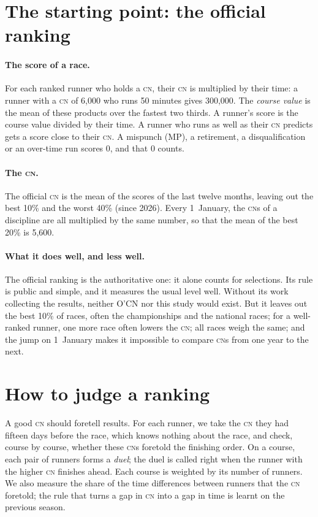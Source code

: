 \documentclass[11pt,a4paper]{article}
\newcommand{\CN}{\textsc{cn}}
\begin{document}
\section{The starting point: the official ranking}

\paragraph{The score of a race.} For each ranked runner who holds a \CN, their \CN{} is multiplied by their time: a runner with a \CN{} of 6,000 who runs 50 minutes gives 300,000. The \emph{course value} is the mean of these products over the fastest two thirds. A runner's score is the course value divided by their time. A runner who runs as well as their \CN{} predicts gets a score close to their \CN. A mispunch (MP), a retirement, a disqualification or an over-time run scores 0, and that 0 counts.

\paragraph{The \CN.} The official \CN{} is the mean of the scores of the last twelve months, leaving out the best 10\% and the worst 40\% (since 2026). Every 1~January, the \CN s of a discipline are all multiplied by the same number, so that the mean of the best 20\% is 5,600.

\paragraph{What it does well, and less well.} The official ranking is the authoritative one: it alone counts for selections. Its rule is public and simple, and it measures the usual level well. Without its work collecting the results, neither O'CN nor this study would exist. But it leaves out the best 10\% of races, often the championships and the national races; for a well-ranked runner, one more race often lowers the \CN; all races weigh the same; and the jump on 1~January makes it impossible to compare \CN s from one year to the next.

\section{How to judge a ranking}

A good \CN{} should foretell results. For each runner, we take the \CN{} they had fifteen days before the race, which knows nothing about the race, and check, course by course, whether these \CN s foretold the finishing order. On a course, each pair of runners forms a \emph{duel}; the duel is called right when the runner with the higher \CN{} finishes ahead. Each course is weighted by its number of runners. We also measure the share of the time differences between runners that the \CN{} foretold; the rule that turns a gap in \CN{} into a gap in time is learnt on the previous season.
\end{document}

